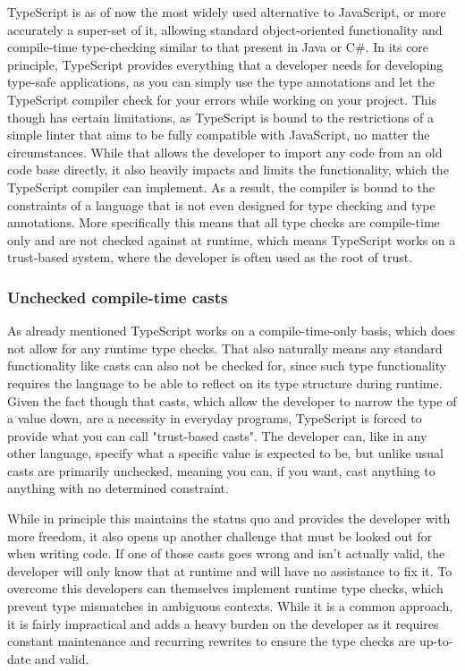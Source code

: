 TypeScript is as of now the most widely used alternative to JavaScript, or more accurately a super-set of it, allowing standard object-oriented functionality and compile-time type-checking similar to that present in Java or C\#. In its core principle, TypeScript provides everything that a developer needs for developing type-safe applications, as you can simply use the type annotations and let the TypeScript compiler check for your errors while working on your project. This though has certain limitations, as TypeScript is bound to the restrictions of a simple linter that aims to be fully compatible with JavaScript, no matter the circumstances. While that allows the developer to import any code from an old code base directly, it also heavily impacts and limits the functionality, which the TypeScript compiler can implement. As a result, the compiler is bound to the constraints of a language that is not even designed for type checking and type annotations. More specifically this means that all type checks are compile-time only and are not checked against at runtime, which means TypeScript works on a trust-based system, where the developer is often used as the root of trust. 

\subsubsection{Unchecked compile-time casts}

As already mentioned TypeScript works on a compile-time-only basis, which does not allow for any runtime type checks. That also naturally means any standard functionality like casts can also not be checked for, since such type functionality requires the language to be able to reflect on its type structure during runtime. Given the fact though that casts, which allow the developer to narrow the type of a value down, are a necessity in everyday programs, TypeScript is forced to provide what you can call "trust-based casts". The developer can, like in any other language, specify what a specific value is expected to be, but unlike usual casts are primarily unchecked, meaning you can, if you want, cast anything to anything with no determined constraint.

While in principle this maintains the status quo and provides the developer with more freedom, it also opens up another challenge that must be looked out for when writing code. If one of those casts goes wrong and isn't actually valid, the developer will only know that at runtime and will have no assistance to fix it. To overcome this developers can themselves implement runtime type checks, which prevent type mismatches in ambiguous contexts. While it is a common approach, it is fairly impractical and adds a heavy burden on the developer as it requires constant maintenance and recurring rewrites to ensure the type checks are up-to-date and valid.

